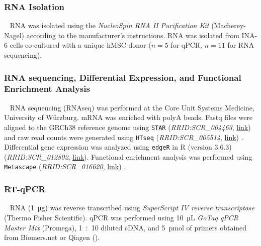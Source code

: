 \subsubsection*{RNA Isolation}
\ %
RNA was isolated using the \textit{NucleoSpin RNA II Purification Kit}
(Macherey-Nagel) according to the manufacturer's instructions. RNA was isolated
from INA-6 cells co-cultured with a unique hMSC donor ($n=5$ for qPCR, $n=11$
for RNA sequencing).

\subsubsection*{RNA sequencing, Differential Expression, and Functional Enrichment Analysis}
\ %
RNA sequencing (RNAseq) was performed at the Core Unit Systems Medicine,
University of Würzburg. mRNA was enriched with polyA beads. Fastq files were
aligned to the GRCh38 reference genome using \texttt{STAR}
(\textit{RRID:SCR\_004463},
\href{https://scicrunch.org/resolver/RRID:SCR_004463}{link}) and raw read
counts were generated using \texttt{HTseq} (\textit{RRID:SCR\_005514},
\href{https://scicrunch.org/resolver/SCR_005514}{link})
\cite{andersHTSeqPythonFramework2015,dobinSTARUltrafastUniversal2013,zerbinoEnsembl20182018}.
Differential gene expression was analyzed using \texttt{edgeR} in R (version
3.6.3) (\textit{RRID:SCR\_012802},
\href{https://scicrunch.org/resolver/SCR_012802}{link}). Functional
enrichment analysis was performed using \texttt{Metascape}
(\textit{RRID:SCR\_016620},
\href{https://scicrunch.org/resolver/SCR_016620}{link})
\cite{zhouMetascapeProvidesBiologistoriented2019}.


\subsubsection*{RT-qPCR}
\ %
RNA (\SI{1}{\micro\gram}) was reverse transcribed using \textit{SuperScript IV
    reverse transcriptase} (Thermo Fisher Scientific). qPCR was performed using
\SI{10}{\micro\liter} \textit{GoTaq qPCR Master Mix} (Promega), \SI{1}{:10}
diluted cDNA, and \SI{5}{pmol} of primers obtained from Biomers.net or Qiagen
().


